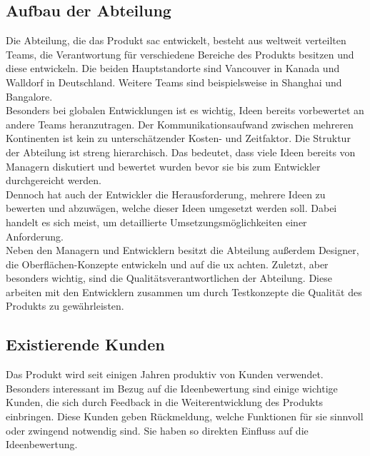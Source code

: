 \subsection{Aufbau der Abteilung}
Die Abteilung, die das Produkt \ac{sac} entwickelt, besteht aus weltweit verteilten Teams, 
die Verantwortung für verschiedene Bereiche des Produkts besitzen und diese entwickeln. 
Die beiden Hauptstandorte sind Vancouver in Kanada und Walldorf in Deutschland. Weitere Teams sind beispielsweise in 
Shanghai und Bangalore.\\
Besonders bei globalen Entwicklungen ist es wichtig, Ideen bereits vorbewertet an andere Teams 
heranzutragen. Der Kommunikationsaufwand zwischen mehreren Kontinenten ist kein zu unterschätzender Kosten- und Zeitfaktor. 
Die Struktur der Abteilung ist streng hierarchisch. Das bedeutet, dass viele Ideen bereits von Managern diskutiert und 
bewertet wurden bevor sie bis zum Entwickler durchgereicht werden.\\
Dennoch hat auch der Entwickler die Herausforderung, 
mehrere Ideen zu bewerten und abzuwägen, welche dieser Ideen umgesetzt werden soll. Dabei handelt es sich meist, um detaillierte Umsetzungsmöglichkeiten
einer Anforderung.\\ 
Neben den Managern und Entwicklern besitzt die Abteilung außerdem Designer, die Oberflächen-Konzepte entwickeln und auf
die \ac{ux} achten. Zuletzt, aber besonders wichtig, sind die Qualitätsverantwortlichen der Abteilung. Diese 
arbeiten mit den Entwicklern zusammen um durch Testkonzepte die Qualität des Produkts zu gewährleisten.

\subsection{Existierende Kunden}
Das Produkt wird seit einigen Jahren produktiv von Kunden verwendet. Besonders 
interessant im Bezug auf die Ideenbewertung sind einige wichtige Kunden, die sich durch Feedback in die 
Weiterentwicklung des Produkts einbringen. Diese Kunden geben Rückmeldung, welche Funktionen für sie sinnvoll oder 
zwingend notwendig sind. Sie haben so direkten Einfluss auf die Ideenbewertung. 

